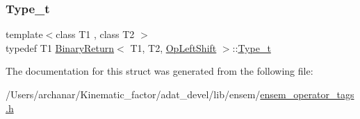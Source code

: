 \mbox{\label{structBinaryReturn_3_01T1_00_01T2_00_01OpLeftShift_01_4_a49e088c9b6e38646dc1ee380d7c79c39}} 
\subsubsection{\texorpdfstring{Type\_t}{Type\_t}\hspace{0.1cm}{\footnotesize\ttfamily [2/2]}}
{\footnotesize\ttfamily template$<$class T1 , class T2 $>$ \\
typedef T1 \mbox{\hyperlink{structBinaryReturn}{Binary\+Return}}$<$ T1, T2, \mbox{\hyperlink{structOpLeftShift}{Op\+Left\+Shift}} $>$\+::\mbox{\hyperlink{structBinaryReturn_3_01T1_00_01T2_00_01OpLeftShift_01_4_a49e088c9b6e38646dc1ee380d7c79c39}{Type\+\_\+t}}}



The documentation for this struct was generated from the following file\+:\begin{DoxyCompactItemize}
\item 
/\+Users/archanar/\+Kinematic\+\_\+factor/adat\+\_\+devel/lib/ensem/\mbox{\hyperlink{lib_2ensem_2ensem__operator__tags_8h}{ensem\+\_\+operator\+\_\+tags.\+h}}\end{DoxyCompactItemize}
